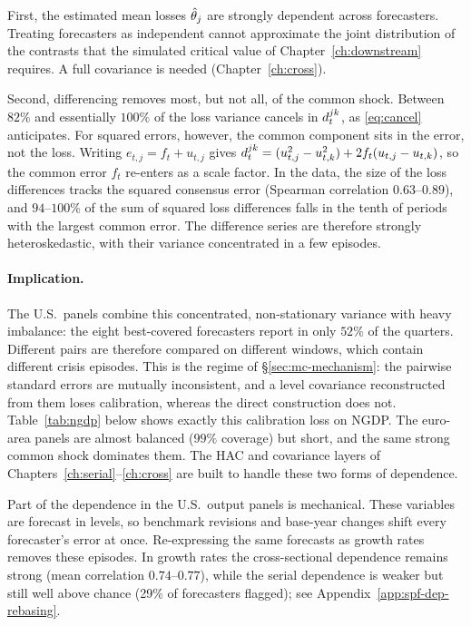 First, the estimated mean losses $\hat{\theta}_j$ are strongly dependent across forecasters.
Treating forecasters as independent cannot approximate the joint distribution of the
contrasts that the simulated critical value of Chapter~\ref{ch:downstream} requires. A
full covariance is needed (Chapter~\ref{ch:cross}).

Second, differencing removes most, but not all, of the common shock. Between $82\%$ and
essentially $100\%$ of the loss variance cancels in $d^{jk}_t$, as \eqref{eq:cancel}
anticipates. For squared errors, however, the common component sits in the error, not
the loss. Writing $e_{t,j}=f_t+u_{t,j}$ gives
$d^{jk}_t=(u_{t,j}^2-u_{t,k}^2)+2f_t(u_{t,j}-u_{t,k})$, so the common error $f_t$
re-enters as a scale factor. In the data, the size of the loss differences tracks the
squared consensus error (Spearman correlation $0.63$--$0.89$), and $94$--$100\%$ of the
sum of squared loss differences falls in the tenth of periods with the largest common
error. The difference series are therefore strongly heteroskedastic, with their variance
concentrated in a few episodes.

\paragraph{Implication.} The U.S.\ panels combine this concentrated, non-stationary
variance with heavy imbalance: the eight best-covered forecasters report in only $52\%$
of the quarters. Different pairs are therefore compared on different windows, which
contain different crisis episodes. This is the regime of \S\ref{sec:mc-mechanism}: the
pairwise standard errors are mutually inconsistent, and a level covariance reconstructed
from them loses calibration, whereas the direct construction does not.
Table~\ref{tab:ngdp} below shows exactly this calibration loss on NGDP. The euro-area
panels are almost balanced ($99\%$ coverage) but short, and the same strong common shock
dominates them. The HAC and covariance layers of
Chapters~\ref{ch:serial}--\ref{ch:cross} are built to handle these two forms of
dependence.

Part of the dependence in the U.S.\ output panels is mechanical. These variables are
forecast in levels, so benchmark revisions and base-year changes shift every forecaster's
error at once. Re-expressing the same forecasts as growth rates removes these episodes.
In growth rates the cross-sectional dependence remains strong (mean correlation
$0.74$--$0.77$), while the serial dependence is weaker but still well above chance (29\%
of forecasters flagged); see Appendix~\ref{app:spf-dep-rebasing}.


